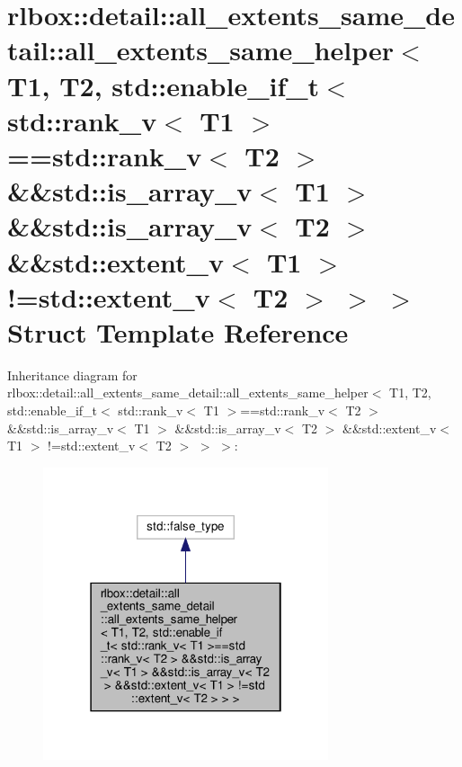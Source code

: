 \hypertarget{structrlbox_1_1detail_1_1all__extents__same__detail_1_1all__extents__same__helper_3_01T1_00_01T2c85c414d786e56b573ef092d9cd9401b}{}\section{rlbox\+:\+:detail\+:\+:all\+\_\+extents\+\_\+same\+\_\+detail\+:\+:all\+\_\+extents\+\_\+same\+\_\+helper$<$ T1, T2, std\+:\+:enable\+\_\+if\+\_\+t$<$ std\+:\+:rank\+\_\+v$<$ T1 $>$==std\+:\+:rank\+\_\+v$<$ T2 $>$ \&\&std\+:\+:is\+\_\+array\+\_\+v$<$ T1 $>$ \&\&std\+:\+:is\+\_\+array\+\_\+v$<$ T2 $>$ \&\&std\+:\+:extent\+\_\+v$<$ T1 $>$ !=std\+:\+:extent\+\_\+v$<$ T2 $>$ $>$ $>$ Struct Template Reference}
\label{structrlbox_1_1detail_1_1all__extents__same__detail_1_1all__extents__same__helper_3_01T1_00_01T2c85c414d786e56b573ef092d9cd9401b}


Inheritance diagram for rlbox\+:\+:detail\+:\+:all\+\_\+extents\+\_\+same\+\_\+detail\+:\+:all\+\_\+extents\+\_\+same\+\_\+helper$<$ T1, T2, std\+:\+:enable\+\_\+if\+\_\+t$<$ std\+:\+:rank\+\_\+v$<$ T1 $>$==std\+:\+:rank\+\_\+v$<$ T2 $>$ \&\&std\+:\+:is\+\_\+array\+\_\+v$<$ T1 $>$ \&\&std\+:\+:is\+\_\+array\+\_\+v$<$ T2 $>$ \&\&std\+:\+:extent\+\_\+v$<$ T1 $>$ !=std\+:\+:extent\+\_\+v$<$ T2 $>$ $>$ $>$\+:\nopagebreak
\begin{figure}[H]
\begin{center}
\leavevmode
\includegraphics[width=238pt]{structrlbox_1_1detail_1_1all__extents__same__detail_1_1all__extents__same__helper_3_01T1_00_01T2d26e799d2358c1b5289bc704cff16ad5}
\end{center}
\end{figure}


